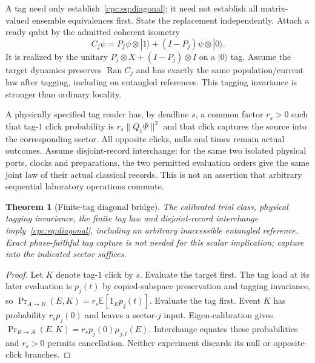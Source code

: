 \documentclass[11pt,oneside,openany]{book}
\newtheorem{theorem}{Theorem}[chapter]
\theoremstyle{definition}
\theoremstyle{remark}\newtheorem{remark}[theorem]{Remark}
\begin{document}
A tag need only establish~\eqref{cpc:eq:diagonal}; it need not establish all matrix-valued ensemble equivalences first. State the replacement independently. Attach a ready qubit by the admitted coherent isometry
\begin{equation}
 C_j\psi=P_j\psi\otimes|1\rangle+(I-P_j)\psi\otimes|0\rangle.
 \label{cpc:eq:tag}
\end{equation}
It is realized by the unitary $P_j\otimes X+(I-P_j)\otimes I$ on a $|0\rangle$ tag. Assume the target dynamics preserves $\operatorname{Ran}C_j$ and has exactly the same population/current law after tagging, including on entangled references. This tagging invariance is stronger than ordinary locality.

A physically specified tag reader has, by deadline $s$, a common factor $r_s>0$ such that tag-$1$ click probability is $r_s\|Q_1\Psi\|^2$ and that click captures the source into the corresponding sector. All opposite clicks, nulls and times remain actual outcomes. Assume disjoint-record interchange: for the same two isolated physical ports, clocks and preparations, the two permitted evaluation orders give the same joint law of their actual classical records. This is not an assertion that arbitrary sequential laboratory operations commute.

\begin{theorem}[Finite-tag diagonal bridge]
\label{cpc:thm:tagbridge}
The calibrated trial class, physical tagging invariance, the finite tag law and disjoint-record interchange imply~\eqref{cpc:eq:diagonal}, including an arbitrary inaccessible entangled reference. Exact phase-faithful tag capture is not needed for this scalar implication; capture into the indicated sector suffices.
\end{theorem}
\begin{proof}
Let $K$ denote tag-$1$ click by $s$. Evaluate the target first. The tag load at its later evaluation is $p_j(t)$ by copied-subspace preservation and tagging invariance, so
$\Pr_{A\to B}(E,K)=r_s\mathbb E[1_Ep_j(t)]$.
Evaluate the tag first. Event $K$ has probability $r_sp_j(0)$ and leaves a sector-$j$ input. Eigen-calibration gives
$\Pr_{B\to A}(E,K)=r_sp_j(0)\mu_{j,t}(E)$.
Interchange equates these probabilities and $r_s>0$ permits cancellation. Neither experiment discards its null or opposite-click branches.
\end{proof}
\end{document}
